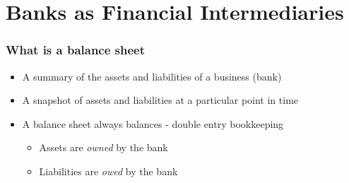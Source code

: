 \documentclass[11pt]{beamer}
\begin{document}
%
\section{Banks as Financial Intermediaries}
%

\begin{frame}
\frametitle{What is a balance sheet}
\begin{itemize}
\item A summary of the assets and liabilities of a business (bank)
\item A snapshot of assets and liabilities at a particular point in time
\item A balance sheet always balances - double entry bookkeeping
\begin{itemize}
\item Assets are \textit{owned} by the bank
\item Liabilities are \textit{owed} by the bank
\end{itemize}
\end{itemize}


\end{frame}





\end{document}
